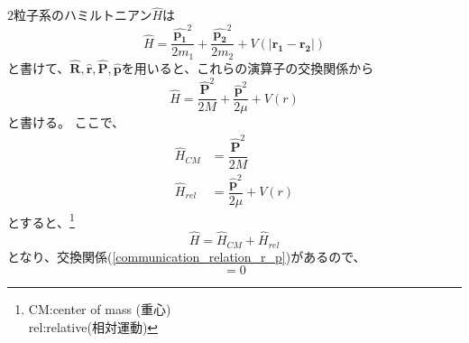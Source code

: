 \documentclass[dvipdfmx,a4paper,16pt]{jsarticle}
\begin{document}
$2$粒子系のハミルトニアン$\hat{H}$は
\begin{equation}
	\hat{H} = \dfrac{\hat{\bm{p_1}}^2}{2m_1} + \dfrac{\hat{\bm{p_2}}^2}{2m_2} + V(|\bm{r_1} - \bm{r_2}|)
\end{equation}
と書けて、$\hat{\bm{R}},\hat{\bm{r}},\hat{\bm{P}},\hat{\bm{p}}$を用いると、これらの演算子の交換関係から
\begin{equation}
\hat{H} = \dfrac{\hat{\bm{P}}^2}{2M} + \dfrac{\hat{\bm{p}}^2}{2\mu} + V(r)
\end{equation}
と書ける。
ここで、
\begin{align}
	\hat{H}_{CM} &= \dfrac{\hat{\bm{P}}^2}{2M} \\
	\hat{H}_{rel} &= \dfrac{\hat{\bm{p}}^2}{2\mu} + V(r)
\end{align}
とすると、\footnote{CM:center of mass (重心) \\ rel:relative(相対運動)}
\begin{equation}
	\hat{H} = \hat{H}_{CM} + \hat{H}_{rel}
\end{equation}
となり、交換関係(\ref{communication_relation_r_p})があるので、
\begin{equation}
	[\hat{H}_{CM},\hat{H}_{rel}] = 0
\end{equation}
\end{document}
